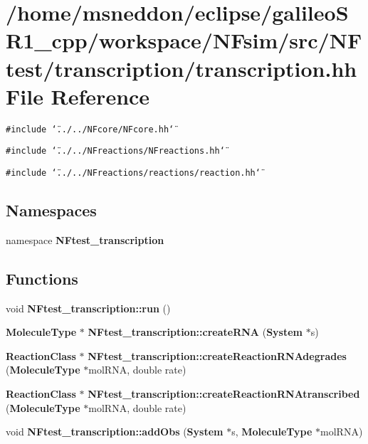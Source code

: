 \section{/home/msneddon/eclipse/galileoSR1\_\-cpp/workspace/NFsim/src/NFtest/transcription/transcription.hh File Reference}
\label{transcription_8hh}


{\tt \#include \char`\"{}../../NFcore/NFcore.hh\char`\"{}}\par
{\tt \#include \char`\"{}../../NFreactions/NFreactions.hh\char`\"{}}\par
{\tt \#include \char`\"{}../../NFreactions/reactions/reaction.hh\char`\"{}}\par
\subsection*{Namespaces}
\begin{CompactItemize}
\item 
namespace {\bf NFtest\_\-transcription}
\end{CompactItemize}
\subsection*{Functions}
\begin{CompactItemize}
\item 
void {\bf NFtest\_\-transcription::run} ()
\item 
{\bf MoleculeType} $\ast$ {\bf NFtest\_\-transcription::createRNA} ({\bf System} $\ast$s)
\item 
{\bf ReactionClass} $\ast$ {\bf NFtest\_\-transcription::createReactionRNAdegrades} ({\bf MoleculeType} $\ast$molRNA, double rate)
\item 
{\bf ReactionClass} $\ast$ {\bf NFtest\_\-transcription::createReactionRNAtranscribed} ({\bf MoleculeType} $\ast$molRNA, double rate)
\item 
void {\bf NFtest\_\-transcription::addObs} ({\bf System} $\ast$s, {\bf MoleculeType} $\ast$molRNA)
\end{CompactItemize}
